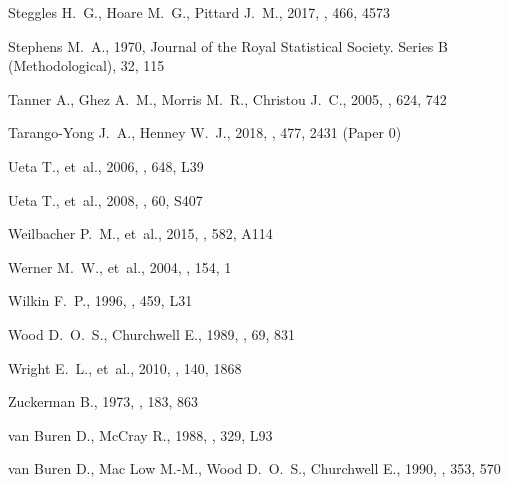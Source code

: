 \documentclass[useAMS, usenatbib, a4paper]{mnras}
\begin{document}
\begin{thebibliography}{}
{Steggles} H.~G.,  {Hoare} M.~G.,   {Pittard} J.~M.,  2017, \mnras, 466, 4573

Stephens M.~A.,  1970, Journal of the Royal Statistical Society. Series B
  (Methodological), 32, 115

{Tanner} A.,  {Ghez} A.~M.,  {Morris} M.~R.,   {Christou} J.~C.,  2005, \apj,
  624, 742

{Tarango-Yong} J.~A.,  {Henney} W.~J.,  2018, \mnras, 477, 2431 (Paper 0)

{Ueta} T.,  et~al., 2006, \apjl, 648, L39

{Ueta} T.,  et~al., 2008, \pasj, 60, S407

{Weilbacher} P.~M.,  et~al., 2015, \aap, 582, A114

{Werner} M.~W.,  et~al., 2004, \apjs, 154, 1

{Wilkin} F.~P.,  1996, \apjl, 459, L31

{Wood} D.~O.~S.,  {Churchwell} E.,  1989, \apjs, 69, 831

{Wright} E.~L.,  et~al., 2010, \aj, 140, 1868

{Zuckerman} B.,  1973, \apj, 183, 863

{van Buren} D.,  {McCray} R.,  1988, \apjl, 329, L93

{van Buren} D.,  {Mac Low} M.-M.,  {Wood} D.~O.~S.,   {Churchwell} E.,  1990,
  \apj, 353, 570


\end{thebibliography}
\end{document}
